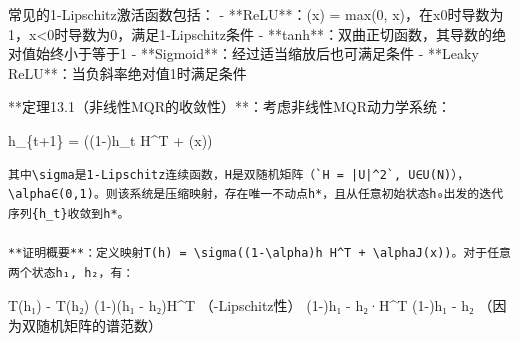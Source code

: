 \documentclass[
  12pt,
]{article}
\newenvironment{Shaded}{}{}
\newcommand{\BuiltInTok}[1]{#1}
\newcommand{\DecValTok}[1]{\textcolor[rgb]{0.25,0.63,0.44}{#1}}
\newcommand{\FloatTok}[1]{\textcolor[rgb]{0.25,0.63,0.44}{#1}}
\newcommand{\NormalTok}[1]{#1}
\newcommand{\OperatorTok}[1]{\textcolor[rgb]{0.40,0.40,0.40}{#1}}
\begin{document}
\begin{Shaded}
\begin{Highlighting}[]
\NormalTok{常见的}\DecValTok{1}\OperatorTok{{-}}\NormalTok{Lipschitz激活函数包括：}
\OperatorTok{{-}} \OperatorTok{**}\NormalTok{ReLU}\OperatorTok{**}\NormalTok{：\textasciigrave{}\sigma(x) }\OperatorTok{=} \BuiltInTok{max}\NormalTok{(}\DecValTok{0}\NormalTok{, x)\textasciigrave{}，在x\geq}\DecValTok{0}\NormalTok{时导数为}\DecValTok{1}\NormalTok{，x}\OperatorTok{\textless{}}\DecValTok{0}\NormalTok{时导数为}\DecValTok{0}\NormalTok{，满足}\DecValTok{1}\OperatorTok{{-}}\NormalTok{Lipschitz条件}
\OperatorTok{{-}} \OperatorTok{**}\NormalTok{tanh}\OperatorTok{**}\NormalTok{：双曲正切函数，其导数的绝对值始终小于等于}\DecValTok{1}
\OperatorTok{{-}} \OperatorTok{**}\NormalTok{Sigmoid}\OperatorTok{**}\NormalTok{：经过适当缩放后也可满足条件}
\OperatorTok{{-}} \OperatorTok{**}\NormalTok{Leaky ReLU}\OperatorTok{**}\NormalTok{：当负斜率绝对值\leq}\DecValTok{1}\NormalTok{时满足条件}

\OperatorTok{**}\NormalTok{定理}\FloatTok{13.1}\NormalTok{（非线性MQR的收敛性）}\OperatorTok{**}\NormalTok{：考虑非线性MQR动力学系统：}
\end{Highlighting}
\end{Shaded}

h\_\{t+1\} = \sigma((1-\alpha)h\_t H\^{}T + \alphaJ(x))

\begin{verbatim}
其中\sigma是1-Lipschitz连续函数，H是双随机矩阵（`H = |U|^2`, U∈U(N)），\alpha∈(0,1)。则该系统是压缩映射，存在唯一不动点h*，且从任意初始状态h₀出发的迭代序列{h_t}收敛到h*。

**证明概要**：定义映射T(h) = \sigma((1-\alpha)h H^T + \alphaJ(x))。对于任意两个状态h₁, h₂，有：
\end{verbatim}

\textbar\textbar T(h₁) - T(h₂)\textbar\textbar{} \leq
\textbar\textbar(1-\alpha)(h₁ - h₂)H\^{}T\textbar\textbar{}
（-Lipschitz性） \leq (1-\alpha)\textbar\textbar h₁ -
h₂\textbar\textbar·\textbar\textbar H\^{}T\textbar\textbar{} \leq
(1-\alpha)\textbar\textbar h₁ - h₂\textbar\textbar{}
（因为双随机矩阵的谱范数）
\end{document}
